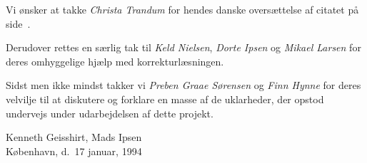 \vspace{4.0mm}
Vi {\o}nsker at takke {\em Christa Trandum\/} for hendes
danske overs{\ae}ttelse af citatet p{\aa}
side~\pageref{`cite:Nernst'}.

\vspace{2.5mm}
Derudover rettes en s{\ae}rlig tak til {\em Keld
Nielsen\/}, {\em Dorte Ipsen\/} og {\em Mikael Larsen\/}
for deres omhyggelige hj{\ae}lp med korrekturl{\ae}sningen.

\vspace{2.5mm}
Sidst men ikke mindst takker vi {\em Preben Graae
S{\o}rensen\/} og {\em Finn Hynne\/} for deres velvilje til
at diskutere og forklare en masse af de uklarheder, der
opstod undervejs under udarbejdelsen af dette projekt.

\vspace{1.0cm}
\begin{flushright}
  Kenneth Geisshirt, Mads Ipsen\\
  K{\o}benhavn, d.\ 17 januar, 1994
\end{flushright}









